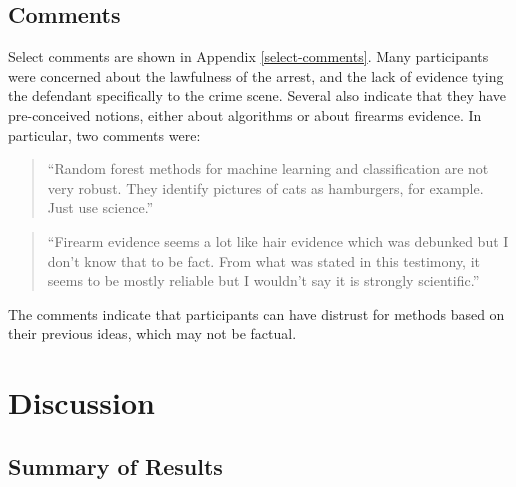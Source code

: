 \documentclass[print]{nuthesis}
\begin{document}
\hypertarget{comments}{%
\subsection{Comments}\label{comments}}

Select comments are shown in Appendix \ref{select-comments}.
Many participants were concerned about the lawfulness of the arrest, and the lack of evidence tying the defendant specifically to the crime scene.
Several also indicate that they have pre-conceived notions, either about algorithms or about firearms evidence.
In particular, two comments were:

\begin{quote}
``Random forest methods for machine learning and classification are not very robust. They identify pictures of cats as hamburgers, for example. Just use science.''
\end{quote}

\begin{quote}
``Firearm evidence seems a lot like hair evidence which was debunked but I don't know that to be fact. From what was stated in this testimony, it seems to be mostly reliable but I wouldn't say it is strongly scientific.''
\end{quote}

The comments indicate that participants can have distrust for methods based on their previous ideas, which may not be factual.

\hypertarget{discussion}{%
\section{Discussion}\label{discussion}}

\hypertarget{summary-of-results}{%
\subsection{Summary of Results}\label{summary-of-results}}
\end{document}
